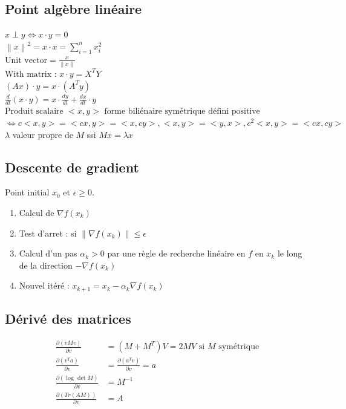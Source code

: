 \documentclass{article}
\begin{document}
\begin{multicols}{2}
\subsection{Point algèbre linéaire}
$\displaystyle x \perp y \Leftrightarrow x \cdot y = 0 $ \\
$\displaystyle \left\| x \right\| ^2 = x \cdot x = \sum_{i=1}^{n}x_i^2 $ \\ 
$\displaystyle \text{Unit vector} = \frac{x}{\left\| x \right\| } $ \\
$\displaystyle \text{With matrix : } x \cdot y = X^T Y $ \\
$\displaystyle (Ax) \cdot y = x \cdot (A^T y) $ \\
$\displaystyle \frac{d}{dt}(x \cdot y) = x \cdot \frac{dy}{dt} + \frac{dx}{dt}\cdot y $ \\
$\displaystyle \text{Produit scalaire } <x,y> \text{ forme biliénaire symétrique défini positive} $ \\
$\displaystyle \Leftrightarrow c <x, y> = <cx, y> = <x,cy>, <x,y> = <y,x>, c^2 < x,y> = <cx, cy> $ \\
$\displaystyle \lambda  $ valeur propre  de $ M $ ssi $ Mx = \lambda x $ 

\subsection{Descente de gradient}
Point initial $ x_0 $ et $ \epsilon \geq 0 $.
\begin{enumerate}
    \item Calcul de $ \nabla f(x_k) $ 
    \item Test d'arret : si $ \left\| \nabla f(x_k) \right\| \leq \epsilon  $ 
    \item Calcul d'un pas $ \alpha _k > 0 $ par une règle de recherche linéaire en $ f $ en $ x_k $ le long de la direction $ - \nabla f(x_k) $ 
    \item Nouvel itéré : $ x_{k+1} = x_k - \alpha _k \nabla f(x_k) $ 
\end{enumerate}

\subsection{Dérivé des matrices}
\begin{align*}
    \frac{\partial (vMv)}{\partial v} &= (M + M^T)V = 2MV \text{ si } M \text{ symétrique} \\
    \frac{\partial (v^T a)}{\partial v} &= \frac{\partial (a^T v)}{\partial v} = a \\
    \frac{\partial (\log_{} \det M)}{\partial v} &= M^{-1}\\
    \frac{\partial (Tr(AM))}{\partial v} &= A
\end{align*}


\end{multicols}
\end{document}

